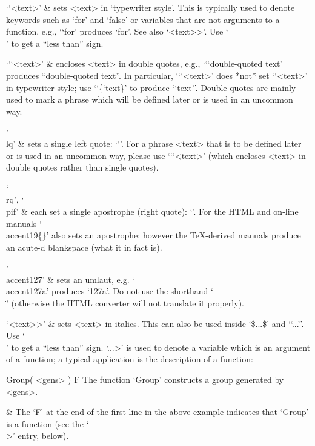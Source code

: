 \beginitems

`\lq<text>\pif' &
    sets <text> in `typewriter style'.
    This is typically used to denote {\GAP} keywords such  as  `for'  and
    `false' or variables that are not  arguments  to  a  function,  e.g.,
    `{\lq}for\pif' produces `for'. 
    See also `\<<text>>'. 
    Use `\\\<' to get a ``less than'' sign.

`\lq\lq<text>\pif\pif' &
    encloses <text> in double quotes, 
    e.g., `\lq{\lq}double-quoted text\pif\pif' produces 
    ``double-quoted text''.
    In particular, `\lq\lq<text>\pif\pif' does *not* set  `\lq<text>\pif'
    in typewriter  style;  use  `{\lq\{{\lq}text\pif\}\pif}'  to  produce
    `{`text'}'. Double quotes are mainly used to mark a phrase which will
    be defined later or is used in an uncommon way.

`\\lq' &
    sets a single left quote: `\lq'. 
    For a phrase <text> that is to be defined later  or  is  used  in  an
    uncommon way, please use `\lq\lq<text>\pif\pif' (which encloses <text>
    in double quotes rather than single quotes).

`\\rq', `\\pif' &
    each set a single apostrophe (right quote): `\pif'.  For the HTML and 
    on-line manuals `\\accent19\{\}' also sets an apostrophe; however the
    {\TeX}-derived manuals produce an acute-d blankspace (what it in fact
    is).

`\\accent127' &
    sets an umlaut, e.g. `\\accent127a' produces  `\accent127a'.  Do  not
    use the shorthand `\\\"'  (otherwise  the  HTML  converter  will  not
    translate it properly).

`\<<text>>' &
    sets <text> in italics. This can also be used  inside  `\$...\$'  and
    `{`...'}'. Use `\\\<' to get a ``less than'' sign. `\<...>'  is  used
    to denote a variable which is an argument of a  function;  a  typical
    application is the description of a function:

\begintt
\>Group( <gens> ) F
The function `Group' constructs a group generated by <gens>.
\endtt

  & 
    The `F' at the end of the first line in the above  example  indicates
    that `Group' is a function (see the `\\>' entry, below).

